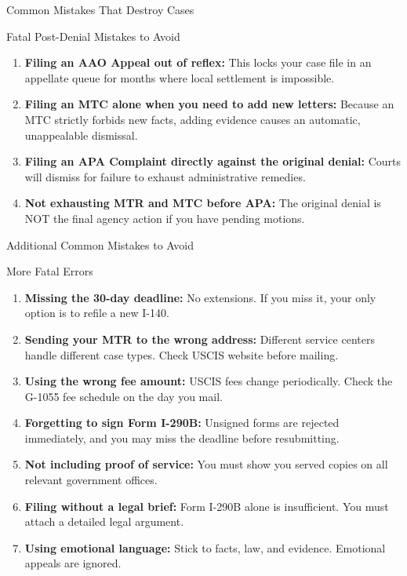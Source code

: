 \documentclass[11pt]{beamer}
\begin{document}
	\begin{frame}{Common Mistakes That Destroy Cases}
		\scriptsize
		\begin{block}{Fatal Post-Denial Mistakes to Avoid}
			\begin{enumerate}
				\item \textbf{Filing an AAO Appeal out of reflex:} This locks your case file in an appellate queue for months where local settlement is impossible.
				\item \textbf{Filing an MTC alone when you need to add new letters:} Because an MTC strictly forbids new facts, adding evidence causes an automatic, unappealable dismissal.
				\item \textbf{Filing an APA Complaint directly against the original denial:} Courts will dismiss for failure to exhaust administrative remedies.
				\item \textbf{Not exhausting MTR and MTC before APA:} The original denial is NOT the final agency action if you have pending motions.
			\end{enumerate}
		\end{block}
	\end{frame}
	
	\begin{frame}{Additional Common Mistakes to Avoid}
		\scriptsize
		\begin{block}{More Fatal Errors}
			\begin{enumerate}
				\item \textbf{Missing the 30-day deadline:} No extensions. If you miss it, your only option is to refile a new I-140.
				\item \textbf{Sending your MTR to the wrong address:} Different service centers handle different case types. Check USCIS website before mailing.
				\item \textbf{Using the wrong fee amount:} USCIS fees change periodically. Check the G-1055 fee schedule on the day you mail.
				\item \textbf{Forgetting to sign Form I-290B:} Unsigned forms are rejected immediately, and you may miss the deadline before resubmitting.
				\item \textbf{Not including proof of service:} You must show you served copies on all relevant government offices.
				\item \textbf{Filing without a legal brief:} Form I-290B alone is insufficient. You must attach a detailed legal argument.
				\item \textbf{Using emotional language:} Stick to facts, law, and evidence. Emotional appeals are ignored.
			\end{enumerate}
		\end{block}
	\end{frame}
	
\end{document}
